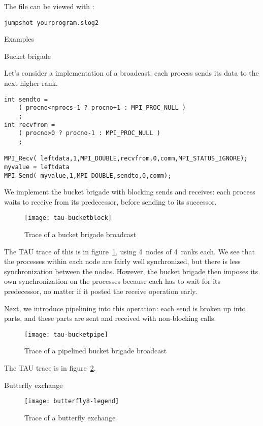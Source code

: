 The  file can be viewed with :
\begin{verbatim}
jumpshot yourprogram.slog2
\end{verbatim}

 {Examples}

 {Bucket brigade}

Let's consider a  implementation of a broadcast:
each process sends its data to the next higher rank. 
%
\begin{lstlisting}
int sendto =
    ( procno<nprocs-1 ? procno+1 : MPI_PROC_NULL )
    ;
int recvfrom =
    ( procno>0 ? procno-1 : MPI_PROC_NULL )
    ;

MPI_Recv( leftdata,1,MPI_DOUBLE,recvfrom,0,comm,MPI_STATUS_IGNORE);
myvalue = leftdata
MPI_Send( myvalue,1,MPI_DOUBLE,sendto,0,comm);
\end{lstlisting}

We implement the bucket brigade
with blocking sends and receives: each process waits to receive from its
predecessor, before sending to its successor.
%
%
\begin{figure}[ht]
\texttt{[image: tau-bucketblock]}
\caption{Trace of a bucket brigade broadcast}
\label{fig:tau-bucketblock}
\end{figure}
%
The TAU trace of this is in figure~\ref{fig:tau-bucketblock},
using 4~nodes of 4~ranks each.
We see that the processes within each node are fairly well synchronized,
but there is less synchronization between the nodes.
However, the bucket brigade then imposes its own synchronization on the processes
because each has to wait for its predecessor, no matter if it posted
the receive operation early.

Next, we introduce pipelining into this operation:
each send is broken up into parts, and these parts are sent
and received with non-blocking calls.
%
%
\begin{figure}[ht]
\texttt{[image: tau-bucketpipe]}
\caption{Trace of a pipelined bucket brigade broadcast}
\label{fig:tau-bucketpipe}
\end{figure}
%
The TAU trace is in figure~\ref{fig:tau-bucketpipe}.

 {Butterfly exchange}

\begin{figure}[ht]
\texttt{[image: butterfly8-legend]}
\caption{Trace of a butterfly exchange}
\label{fig:tau-b8legend}
\end{figure}

